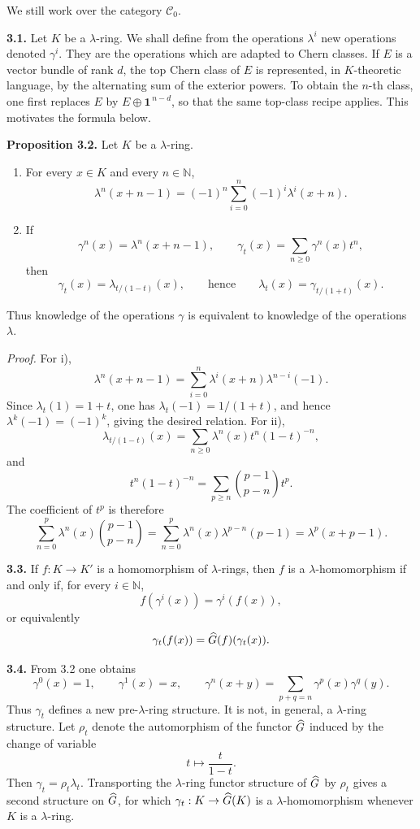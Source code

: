 \documentclass[11pt]{article}
\begin{document}
We still work over the category \(\mathscr C_0\).

\textbf{3.1.} Let \(K\) be a \(\lambda\)-ring. We shall define from the operations \(\lambda^i\) new operations denoted \(\gamma^i\). They are the operations which are adapted to Chern classes. If \(E\) is a vector bundle of rank \(d\), the top Chern class of \(E\) is represented, in \(K\)-theoretic language, by the alternating sum of the exterior powers. To obtain the \(n\)-th class, one first replaces \(E\) by \(E\oplus\mathbf1^{\,n-d}\), so that the same top-class recipe applies. This motivates the formula below.

\textbf{Proposition 3.2.} Let \(K\) be a \(\lambda\)-ring.
\begin{enumerate}[label=\roman*)]
\item For every \(x\in K\) and every \(n\in\mathbb N\),
\[
  \lambda^n(x+n-1)=(-1)^n\sum_{i=0}^n(-1)^i\lambda^i(x+n).
\]
\item If
\[
  \gamma^n(x)=\lambda^n(x+n-1),\qquad
  \gamma_t(x)=\sum_{n\ge0}\gamma^n(x)t^n,
\]
then
\[
  \gamma_t(x)=\lambda_{t/(1-t)}(x),
  \qquad\text{hence}\qquad
  \lambda_t(x)=\gamma_{t/(1+t)}(x).
\]
\end{enumerate}
Thus knowledge of the operations \(\gamma\) is equivalent to knowledge of the operations \(\lambda\).

\emph{Proof.} For i),
\[
  \lambda^n(x+n-1)=\sum_{i=0}^{n}\lambda^i(x+n)\lambda^{n-i}(-1).
\]
Since \(\lambda_t(1)=1+t\), one has \(\lambda_t(-1)=1/(1+t)\), and hence \(\lambda^k(-1)=(-1)^k\), giving the desired relation. For ii),
\[
  \lambda_{t/(1-t)}(x)=\sum_{n\ge0}\lambda^n(x)t^n(1-t)^{-n},
\]
and
\[
  t^n(1-t)^{-n}=\sum_{p\ge n}\binom{p-1}{p-n}t^p.
\]
The coefficient of \(t^p\) is therefore
\[
  \sum_{n=0}^{p}\lambda^n(x)\binom{p-1}{p-n}
  =\sum_{n=0}^{p}\lambda^n(x)\lambda^{p-n}(p-1)
  =\lambda^p(x+p-1).
\]

\textbf{3.3.} If \(f:K\to K'\) is a homomorphism of \(\lambda\)-rings, then \(f\) is a \(\lambda\)-homomorphism if and only if, for every \(i\in\mathbb N\),
\[
  f(\gamma^i(x))=\gamma^i(f(x)),
\]
or equivalently
\[
  \gamma_t(f(x))=\widehat G(f)(\gamma_t(x)).
\]

\textbf{3.4.} From 3.2 one obtains
\begin{equation}\tag{3.4.1}
  \gamma^0(x)=1,
  \qquad \gamma^1(x)=x,
  \qquad \gamma^n(x+y)=\sum_{p+q=n}\gamma^p(x)\gamma^q(y).
\end{equation}
Thus \(\gamma_t\) defines a new pre-\(\lambda\)-ring structure. It is not, in general, a \(\lambda\)-ring structure. Let \(\rho_t\) denote the automorphism of the functor \(\widehat G\) induced by the change of variable
\[
  t\longmapsto \frac{t}{1-t}.
\]
Then \(\gamma_t=\rho_t\lambda_t\). Transporting the \(\lambda\)-ring functor structure of \(\widehat G\) by \(\rho_t\) gives a second structure on \(\widehat G\), for which \(\gamma_t:K\to\widehat G(K)\) is a \(\lambda\)-homomorphism whenever \(K\) is a \(\lambda\)-ring.
\end{document}
